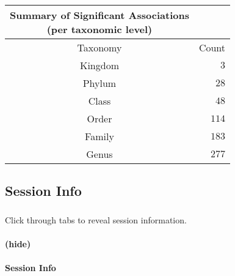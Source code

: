 \documentclass[
]{article}
\begin{document}
\begin{longtable}{@{\extracolsep{\fill}}cr}
\caption*{
{\large Summary of Significant Associations} \\ 
{\small (per taxonomic level)}
} \\ 
\toprule
Taxonomy & Count \\ 
\midrule\addlinespace[2.5pt]
Kingdom & $3$ \\ 
Phylum & $28$ \\ 
Class & $48$ \\ 
Order & $114$ \\ 
Family & $183$ \\ 
Genus & $277$ \\ 
\bottomrule
\end{longtable}
\setlength\LTleft{\holdLTleft}
\setlength\LTright{\holdLTright}

\subsection{Session Info}\label{session-info}

\subsubsection{}\label{section-7}

Click through tabs to reveal session information.

\paragraph{(hide)}\label{hide-29}

\paragraph{Session Info}\label{session-info-1}
\end{document}
